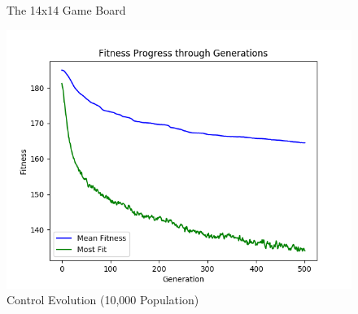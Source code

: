 \documentclass[12pt]{article}
\begin{document}
\begin{figure}[ht]
\caption{The 14x14 Game Board}
\label{fig:game_board}
\end{figure}

\begin{figure}[ht]
\centering
\includegraphics[width=1\textwidth]{Figures/control_fitness}
\caption{Control Evolution (10,000 Population)}
\label{fig:control_fitness}
\end{figure}
\end{document}
